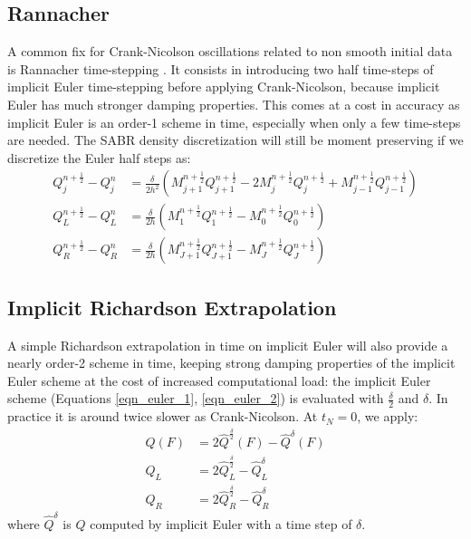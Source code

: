 \documentclass[]{rAMF2e}
\begin{document}
\subsection{Rannacher}
A common fix for Crank-Nicolson oscillations related to non smooth initial data is Rannacher time-stepping \citep{rannacher1984finite, GiCa2006}. It consists in introducing two half time-steps of implicit Euler time-stepping before applying Crank-Nicolson, because implicit Euler has much stronger damping properties. This comes at a cost in accuracy as implicit Euler is an order-1 scheme in time, especially when only a few time-steps are needed.
The SABR density discretization will still be moment preserving if we discretize the Euler half steps as:
\begin{align}\label{eqn_euler_1}
Q_j^{n+\frac{1}{2}}-Q_j^n &= \frac{\delta}{2h^2} \left(M_{j+1}^{n+\frac{1}{2}}Q_{j+1}^{n+\frac{1}{2}}-2M_j^{n+\frac{1}{2}}Q_j^{n+\frac{1}{2}}+M_{j-1}^{n+\frac{1}{2}}Q_{j-1}^{n+\frac{1}{2}} \right) \\
\label{eqn_euler_2}
Q_L^{n+\frac{1}{2}}-Q_L^n &= \frac{\delta}{2h} \left(M_{1}^{n+\frac{1}{2}}Q_{1}^{n+\frac{1}{2}}-M_0^{n+\frac{1}{2}}Q_0^{n+\frac{1}{2}}\right) \\
Q_R^{n+\frac{1}{2}}-Q_R^n &= \frac{\delta}{2h} \left(M_{J+1}^{n+\frac{1}{2}}Q_{J+1}^{n+\frac{1}{2}}-M_J^{n+\frac{1}{2}}Q_J^{n+\frac{1}{2}}\right) 
\end{align}

\subsection{Implicit Richardson Extrapolation}
A simple Richardson extrapolation in time \citep{richardson1911approximate} on implicit Euler will also provide a nearly order-2 scheme in time, keeping strong damping properties of the implicit Euler scheme at the cost of increased computational load: the implicit Euler scheme (Equations \ref{eqn_euler_1}, \ref{eqn_euler_2}) is evaluated with $\frac{\delta}{2}$ and $\delta$. In practice it is around twice slower as Crank-Nicolson. At $t_N=0$, we apply:
\begin{align}\label{eqn_richardson}
Q(F) &= 2 \hat{Q}^{\frac{\delta}{2}}(F) - \hat{Q}^{\delta}(F) \\
Q_L &= 2 \hat{Q}^{\frac{\delta}{2}}_L - \hat{Q}^{\delta}_L\\
Q_R &= 2 \hat{Q}^{\frac{\delta}{2}}_R - \hat{Q}^{\delta}_R
\end{align}
where $\hat{Q}^{\delta}$ is $Q$ computed by implicit Euler with a time step of $\delta$.
\end{document}
